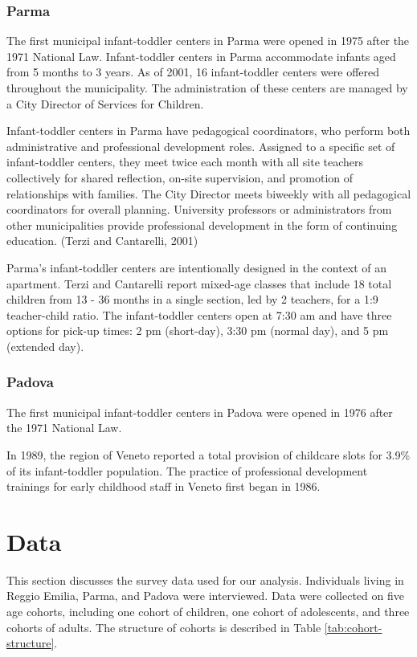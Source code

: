 \subsubsection{Parma}
The first municipal infant-toddler centers in Parma were opened in 1975 after the 1971 National Law. Infant-toddler centers in Parma accommodate infants aged from 5 months to 3 years. As of 2001, 16 infant-toddler centers were offered throughout the municipality. The administration of these centers are managed by a City Director of Services for Children. 

Infant-toddler centers in Parma have pedagogical coordinators, who perform both administrative and professional development roles. Assigned to a specific set of infant-toddler centers, they meet twice each month with all site teachers collectively for shared reflection, on-site supervision, and promotion of relationships with families. The City Director meets biweekly with all pedagogical coordinators for overall planning. University professors or administrators from other municipalities provide professional development in the form of continuing education. (Terzi and Cantarelli, 2001)

Parma's infant-toddler centers are intentionally designed in the context of an apartment. Terzi and Cantarelli report mixed-age classes that include 18 total children from 13 - 36 months in a single section, led by 2 teachers, for a 1:9 teacher-child ratio. The infant-toddler centers open at 7:30 am and have three options for pick-up times: 2 pm (short-day), 3:30 pm (normal day), and 5 pm (extended day).


\subsubsection{Padova}
The first municipal infant-toddler centers in Padova were opened in 1976 after the 1971 National Law. 

In 1989, the region of Veneto reported a total provision of childcare slots for 3.9\% of its infant-toddler population. The practice of professional development trainings for early childhood staff in Veneto first began in 1986.



\section{Data} \label{sec:data}

This section discusses the survey data used for our analysis. Individuals living in Reggio Emilia, Parma, and Padova were interviewed. Data were collected on five age cohorts, including one cohort of children, one cohort of adolescents, and three cohorts of adults. The structure of cohorts is described in Table \ref{tab:cohort-structure}.

